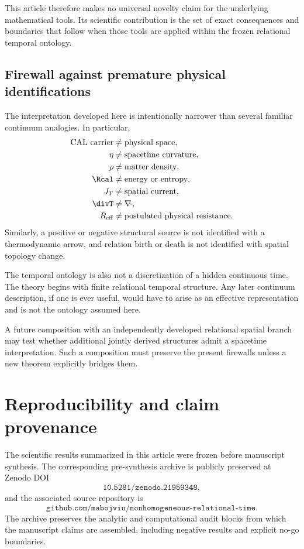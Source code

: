 This article therefore makes no universal novelty claim for the underlying mathematical tools. Its scientific contribution is the set of exact consequences and boundaries that follow when those tools are applied within the frozen relational temporal ontology.

\subsection{Firewall against premature physical identifications}

The interpretation developed here is intentionally narrower than several familiar continuum analogies. In particular,
\begin{align}
\text{CAL carrier}&\neq\text{physical space},\\
\eta&\neq\text{spacetime curvature},\\
\rho&\neq\text{matter density},\\
\Rcal&\neq\text{energy or entropy},\\
J_T&\neq\text{spatial current},\\
\divT&\neq\nabla\!\cdot,\\
R_{\rm eff}&\neq\text{postulated physical resistance}.
\end{align}
Similarly, a positive or negative structural source is not identified with a thermodynamic arrow, and relation birth or death is not identified with spatial topology change.

The temporal ontology is also not a discretization of a hidden continuous time. The theory begins with finite relational temporal structure. Any later continuum description, if one is ever useful, would have to arise as an effective representation and is not the ontology assumed here.

A future composition with an independently developed relational spatial branch may test whether additional jointly derived structures admit a spacetime interpretation. Such a composition must preserve the present firewalls unless a new theorem explicitly bridges them.

\section{Reproducibility and claim provenance}
\label{sec:workflow}

The scientific results summarized in this article were frozen before manuscript synthesis. The corresponding pre-synthesis archive is publicly preserved at Zenodo DOI
\begin{equation}
\texttt{10.5281/zenodo.21959348},
\end{equation}
and the associated source repository is
\begin{equation}
\texttt{github.com/mabojviu/nonhomogeneous-relational-time}.
\end{equation}
The archive preserves the analytic and computational audit blocks from which the manuscript claims are assembled, including negative results and explicit no-go boundaries.

